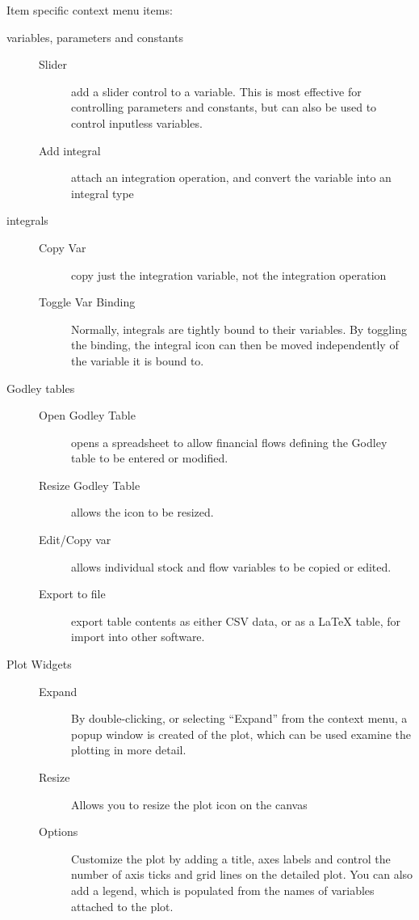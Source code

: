 Item specific context menu items:
\begin{description}
\item[variables, parameters and constants]
\begin{description}
\item[Slider] add a slider control to a variable. This is most
effective for controlling parameters and constants, but can also be
used to control inputless variables.
\item[Add integral] attach an integration operation, and convert the
variable into an integral type
\end{description}
\item[integrals]
\begin{description}
\item[Copy Var] copy just the integration variable, not the
integration operation
\item[Toggle Var Binding] Normally, integrals are tightly bound to their
variables. By toggling the binding, the integral icon can then be
moved independently of the variable it is bound to. 
\end{description}
\item[Godley tables]
\begin{description}
\item[Open Godley Table] opens a spreadsheet to allow financial flows
defining the Godley table to be entered or modified.
\item[Resize Godley Table] allows the icon to be resized.
\item[Edit/Copy var] allows individual stock and flow variables to be
copied or edited.
\item[Export to file] export table contents as either CSV data, or as a LaTeX
table, for import into other software.
\end{description}
\item[Plot Widgets]
\begin{description}
\item[Expand]
By double-clicking, or selecting ``Expand'' from the context menu, a
popup window is created of the plot, which can be used examine the
plotting in more detail.

\item[Resize] Allows you to resize the plot icon on the canvas
\item[Options] Customize the plot by adding a title, axes labels and
  control the number of axis ticks and grid lines on the detailed
  plot. You can also add a legend, which is populated from the names
  of variables attached to the plot.
\end{description}

\end{description}

